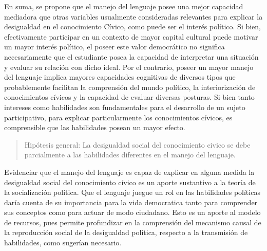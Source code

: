 \documentclass[12pt,twoside]{templates/facsothesis}
\begin{document}
En suma, se propone que el manejo del lenguaje posee una mejor capacidad mediadora que otras variables usualmente consideradas relevantes para explicar la desigualdad en el conocimiento Cívico, como puede ser el interés político. Si bien, efectivamente participar en un contexto de mayor capital cultural puede motivar un mayor interés político, el poseer este valor democrático no significa necesariamente que el estudiante posea la capacidad de interpretar una situación y evaluar su relación con dicho ideal. Por el contrario, poseer un mayor manejo del lenguaje implica mayores capacidades cognitivas de diversos tipos que probablemente facilitan la comprensión del mundo político, la interiorización de conocimientos cívicos y la capacidad de evaluar diversas posturas. Si bien tanto intereses como habilidades son fundamentales para el desarrollo de un sujeto participativo, para explicar particularmente los conocimientos cívicos, es comprensible que las habilidades posean un mayor efecto.

\begin{quote}
Hipótesis general: La desigualdad social del conocimiento civico se debe parcialmente a las habilidades diferentes en el manejo del lenguaje.
\end{quote}

Evidenciar que el manejo del lenguaje es capaz de explicar en alguna medida la desigualdad social del conocimiento cívico es un aporte sustantivo a la teoría de la socialización política. Que el lenguaje juegue un rol en las habilidades políticas daría cuenta de su importancia para la vida democratica tanto para comprender sus conceptos como para actuar de modo ciudadano. Esto es un aporte al modelo de recursos, pues permite profundizar en la comprensión del mecanismo causal de la reproducción social de la desigualdad politica, respecto a la transmisión de habilidades, como \citet{bradyPoliticalMobilityPolitical2015} sugerían necesario.
\end{document}
